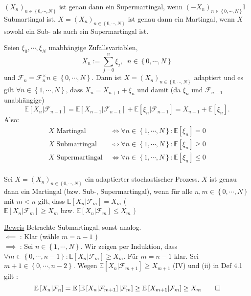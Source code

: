 $ \left( X_n \right)_{n \in \left\{ 0 , \cdots, N \right\}} $ ist genau dann ein Supermartingal, wenn $ \left( - X_n \right)_{n \in \left\{ 0 , \cdots, N \right\} } $l Submartingal ist. $ X =  \left( X_n \right)_{n \in \left\{ 0 , \cdots, N \right\}}  $ ist genau dann ein Martingal, wenn $ X $ sowohl ein Sub- als auch ein Supermartingal ist.

Seien $ \xi_0 , \cdots, \xi_N $ unabhängige Zufallsvariablen,
$$ X_n := \sum_{j=0}^{n} \xi_j, \; \; n \in \left\{ 0 , \cdots, N \right\} $$
und $ \mathcal{F}_{n} = \mathcal{F}^{\times}_{n} n \in \left\{ 0 , \cdots, N \right\} $. Dann ist $   X =  \left( X_n \right)_{n \in \left\{ 0 , \cdots, N \right\}}  $  adaptiert und es gilt $ \forall n \in \left\{ 1 , \cdots, N \right\} \text{, dass  } X_n = X_{n+1} + \xi_n $ 
und damit (da $ \xi_n \text{ und }  \mathcal{F}_{n-1} $ unabhängige)
$$ \mathbb{E} \left[ X_n | \mathcal{F}_{n-1} \right] = \mathbb{E} \left[ X_{n-1} | \mathcal{F}_{n-1} \right] + \mathbb{E} \left[ \xi_n | \mathcal{F}_{n-1} \right] = X_{n-1} + \mathbb{E} \left[ \xi_n \right]. $$
Also:
\begin{align*}
	X \text{ Martingal }    &\iff  \forall n \in \left\{ 1 , \cdots, N \right\}: \mathbb{E} \left[ \xi_n \right] = 0 \\
	X \text{ Submartingal }    &\iff  \forall n \in \left\{ 1 , \cdots, N \right\}: \mathbb{E} \left[ \xi_n \right] \geq 0 \\
	X \text{ Supermartingal }    &\iff  \forall n \in \left\{ 1 , \cdots, N \right\}: \mathbb{E} \left[ \xi_n \right] \leq 0 \\
\end{align*}

Sei $    X =  \left( X_n \right)_{n \in \left\{ 0 , \cdots, N \right\}}  $ ein adaptierter stochastischer Prozess. $ X $ ist genau dann ein Martingal (bzw. Sub-, Supermartingal), wenn für alle $ n, m \in \left\{ 0 , \cdots,  N \right\} $ mit $ m < n $ gilt, dass $\mathbb{E} \left[ X_n | \mathcal{F}_{m} \right] = X_{m} $   (   $ \mathbb{E} \left[ X_n | \mathcal{F}_{m} \right] \geq X_{m} 
\text{ bzw. } \mathbb{E} \left[ X_n | \mathcal{F}_{m} \right] \leq X_{m}$ )

\underline{Beweis} Betrachte Submartingal, sonst analog. \\
$ \impliedby  $ : Klar (wähle $ m = n -1 $ )\\
$ \implies $ : Sei $ n \in \left\{ 1 , \cdots, N \right\} $. Wir zeigen per Induktion, dass $ \forall m \in \left\{ 0 , \cdots, n-1 \right\}: \mathbb{E} \left[ X_n | \mathcal{F}_{m} \right] \geq X_m $. Für $ m = n-1 $ klar. Sei $ m + 1 \in \left\{ 0 , \cdots, n-2 \right\}. $ 
Wegen $ \mathbb{E} \left[ X_n | \mathcal{F}_{m+1} \right] \geq X_{m+1} $ (IV) und (ii) in Def 4.1 gilt :
$$ \mathbb{E} \left[ X_n | \mathcal{F}_{n} \right] = \mathbb{E} \left[ \mathbb{E} \left[ X_n | \mathcal{F}_{m+1} \right] | \mathcal{F}_{m}\right] \geq \mathbb{E} \left[ X_{m+1}| \mathcal{F}_{m} \right] \geq X_m \qed $$

